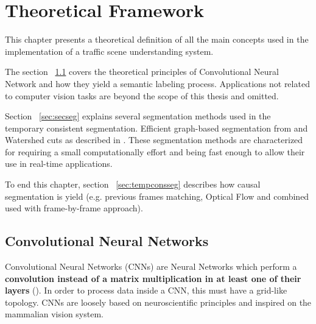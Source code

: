 \chapter{Theoretical Framework}
\label{ch:thefram}
This chapter presents a theoretical definition of all the main concepts used in the implementation of a traffic scene understanding system.

The section ~\ref{sec:cnn} covers the theoretical principles of Convolutional Neural Network and how they yield a semantic labeling process. Applications not related to computer vision tasks are beyond the scope of this thesis and omitted.

Section ~\ref{sec:secseg} explains several segmentation methods used in the temporary consistent segmentation. Efficient graph-based segmentation from \textcite{felzenszwalb2004efficient} and Watershed cuts as described in \textcite{cousty2009watershed}. These segmentation methods are characterized for requiring a small computationally effort and being fast enough to allow their use in real-time applications.  

To end this chapter, section ~\ref{sec:tempconsseg} describes how causal segmentation is yield (e.g. previous frames matching, Optical Flow and combined used with frame-by-frame approach). 

\section{Convolutional Neural Networks}
\label{sec:cnn}

Convolutional Neural Networks (CNNs) are Neural Networks which perform a \textbf{convolution instead of a matrix multiplication in at least one of their layers} (\textcite{Bengio-et-al-2015-Book}). In order to process data inside a CNN, this must have a grid-like topology. CNNs are loosely based on neuroscientific principles and inspired on the mammalian vision system.

